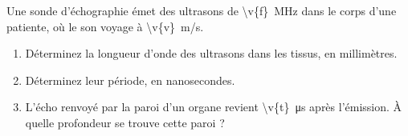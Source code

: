 Une sonde d'échographie émet des ultrasons de \qty{\v{f}}{MHz} dans le corps d'une patiente, où le son voyage à \qty{\v{v}}{m/s}.

\begin{enumerate}[label=\alph*)]
    \item Déterminez la longueur d'onde des ultrasons dans les tissus, en millimètres.
    \item Déterminez leur période, en nanosecondes.
    \item L'écho renvoyé par la paroi d'un organe revient \qty{\v{t}}{\micro\second} après l'émission. À quelle profondeur se trouve cette paroi ?
\end{enumerate}
